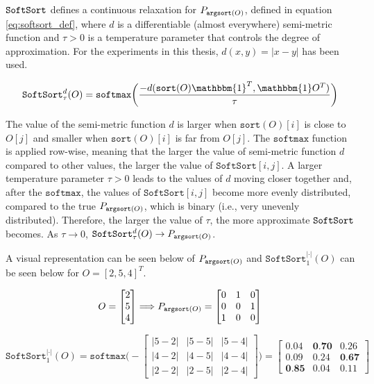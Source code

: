 $\operatorname*{\texttt{SoftSort}}$ defines a continuous relaxation for $P_{\operatorname*{\texttt{argsort}}(O)}$, defined in equation \ref{eq:softsort_def}, where $d$ is a differentiable (almost everywhere) semi-metric function and $\tau >0$ is a temperature parameter that controls the degree of approximation. For the experiments in this thesis, $d(x,y) = |x-y|$ has been used.

\begin{equation} \label{eq:softsort_def}
	\texttt{SoftSort}^d_{\tau}(O) = \texttt{softmax}\bigg( \frac{-d(\texttt{sort}(O)\mathbbm{1}^T, \mathbbm{1}O^T)}{\tau} \bigg)
\end{equation}

The value of the semi-metric function $d$ is larger when $\texttt{sort}(O)[i]$ is close to $O[j]$ and smaller when $\texttt{sort}(O)[i]$ is far from $O[j]$. The $\texttt{softmax}$ function is applied row-wise, meaning that the larger the value of semi-metric function $d$ compared to other values, the larger the value of $\texttt{SoftSort}[i,j]$. A larger temperature parameter $\tau>0$ leads to the values of $d$ moving closer together and, after the $\texttt{softmax}$, the values of $\texttt{SoftSort}[i,j]$ become more evenly distributed, compared to the true $P_{\operatorname*{\texttt{argsort}}(O)}$, which is binary (i.e., very unevenly distributed). Therefore, the larger the value of $\tau$, the more approximate $\operatorname*{\texttt{SoftSort}}$ becomes. As $\tau \to 0$, $\operatorname*{\texttt{SoftSort}}^d_{\tau}(O) \to P_{\operatorname*{\texttt{argsort}}(O)}$.

A visual representation can be seen below of $P_{\operatorname*{\texttt{argsort}}(O)}$ and $\texttt{SoftSort}^{|\cdot|}_{1}(O)$ can be seen below for $O = [2,5,4]^T$.

\begin{equation}
	O = \begin{bmatrix}
		2 \\
		5 \\
		4
	\end{bmatrix}
	\Longrightarrow
	P_{\operatorname*{\texttt{argsort}}(O)} =
	\begin{bmatrix}
		0 & 1 & 0 \\
		0 & 0 & 1 \\
		1 & 0 & 0 \\
	\end{bmatrix}
\end{equation}

\begin{equation} \label{eq:softsort_example}
	\texttt{SoftSort}^{|\cdot|}_{1}(O) = 
	\texttt{softmax} \Bigg(-\begin{bmatrix}
		|5-2| & |5-5| & |5-4| \\
		|4-2| & |4-5| & |4-4| \\
		|2-2| & |2-5| & |2-4|
	\end{bmatrix} \Bigg)	
	=
	\begin{bmatrix}
		0.04 & \textbf{0.70} & 0.26 \\
		0.09 & 0.24 & \textbf{0.67} \\
		\textbf{0.85} & 0.04 & 0.11
	\end{bmatrix}
\end{equation}

